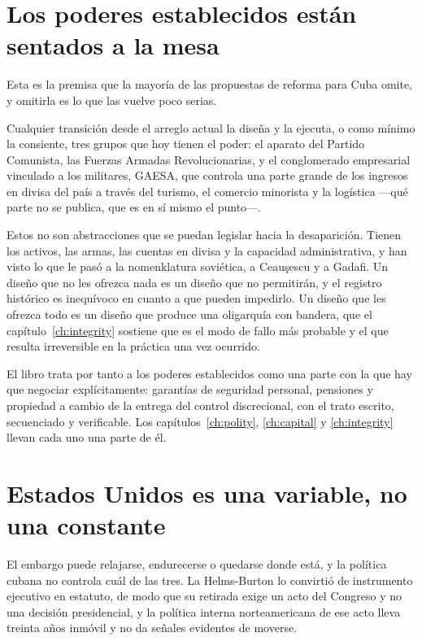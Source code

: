 \section{Los poderes establecidos están sentados a la mesa}

Esta es la premisa que la mayoría de las propuestas de reforma para Cuba omite, y
omitirla es lo que las vuelve poco serias.

Cualquier transición desde el arreglo actual la diseña y la ejecuta, o como mínimo
la consiente, tres grupos que hoy tienen el poder: el aparato del Partido
Comunista, las Fuerzas Armadas Revolucionarias, y el conglomerado empresarial
vinculado a los militares, GAESA, que controla una parte grande de los ingresos en
divisa del país a través del turismo, el comercio minorista y la logística ---qué
parte no se publica, que es en sí mismo el punto---.

Estos no son abstracciones que se puedan legislar hacia la desaparición. Tienen los
activos, las armas, las cuentas en divisa y la capacidad administrativa, y han
visto lo que le pasó a la nomenklatura soviética, a Ceau\c{s}escu y a Gadafi. Un diseño
que no les ofrezca nada es un diseño que no permitirán, y el registro histórico es
inequívoco en cuanto a que pueden impedirlo. Un diseño que les ofrezca todo es un
diseño que produce una oligarquía con bandera, que el capítulo~\ref{ch:integrity}
sostiene que es el modo de fallo más probable y el que resulta irreversible en la
práctica una vez ocurrido.

El libro trata por tanto a los poderes establecidos como una parte con la que hay que
negociar explícitamente: garantías de seguridad personal, pensiones y propiedad a
cambio de la entrega del control discrecional, con el trato escrito, secuenciado y
verificable. Los capítulos~\ref{ch:polity}, \ref{ch:capital} y \ref{ch:integrity}
llevan cada uno una parte de él.

\section{Estados Unidos es una variable, no una constante}

El embargo puede relajarse, endurecerse o quedarse donde está, y la política cubana
no controla cuál de las tres. La Helms-Burton lo convirtió de instrumento ejecutivo
en estatuto, de modo que su retirada exige un acto del Congreso y no una decisión
presidencial, y la política interna norteamericana de ese acto lleva treinta años
inmóvil y no da señales evidentes de moverse.

